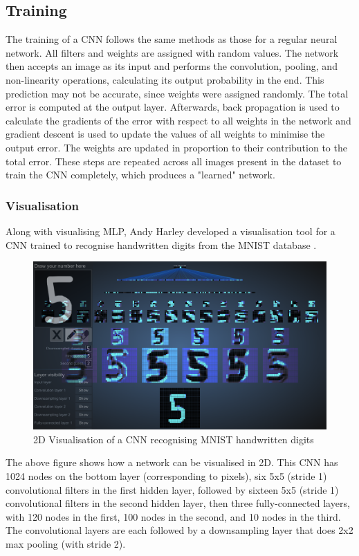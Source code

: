 \subsection*{Training}
\label{sect5_1_2_1b}
The training of a CNN follows the same methods as those for a regular neural network. All filters and weights are assigned with random values. The network then accepts an image as its input and performs the convolution, pooling, and non-linearity operations, calculating its output probability in the end. This prediction may not be accurate, since weights were assigned randomly.\newline\newline
The total error is computed at the output layer. Afterwards, back propagation is used to calculate the gradients of the error with respect to all weights in the network and gradient descent is used to update the values of all weights to minimise the output error. The weights are updated in proportion to their contribution to the total error. These steps are repeated across all images present in the dataset to train the CNN completely, which produces a "learned" network. 
\subsubsection{Visualisation}
\label{sect5_1_2_2}
Along with visualising \ac{MLP}, Andy Harley developed a visualisation tool for a CNN trained to recognise handwritten digits from the MNIST database \cite{harley2015isvc}. 
\begin{figure}[h!]
\centering
\includegraphics[width=12cm]{figures/ConvNet_2D.png}
\caption{2D Visualisation of a CNN recognising MNIST handwritten digits \cite{harley2015isvc}}
\label{fig:cnn13}
\end{figure}

The above figure shows how a network can be visualised in 2D. This CNN has 1024 nodes on the bottom layer (corresponding to pixels), six 5x5 (stride 1) convolutional filters in the first hidden layer, followed by sixteen 5x5 (stride 1) convolutional filters in the second hidden layer, then three fully-connected layers, with 120 nodes in the first, 100 nodes in the second, and 10 nodes in the third. The convolutional layers are each followed by a downsampling layer that does 2x2 max pooling (with stride 2)\cite{harley2015isvc}.

